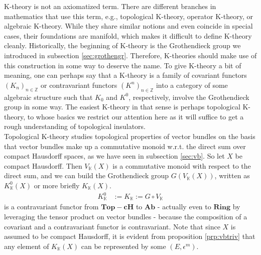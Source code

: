 \nocite{6342e665}
\nocite{8b5861fc}
\nocite{c7f15065}
K-theory is not an axiomatized term.
There are different branches in mathematics that use this term, e.g., topological K-theory, operator K-theory, or algebraic K-theory.
While they share similar notions and even coincide in special cases, their foundations are manifold, which makes it difficult to define K-theory cleanly.
Historically, the beginning of K-theory is the Grothendieck group we introduced in subsection \ref{sec:grothengr}.
Therefore, K-theories should make use of this construction in some way to deserve the name.
To give K-theory a bit of meaning, one can perhaps say that a K-theory is a family of covariant functors $(K_{n})_{n\in\mathbb{Z}}$ or contravariant functors $(K^{n})_{n\in\mathbb{Z}}$ into a category of some algebraic structure such that $K_{0}$ and $K^{0}$, respectively, involve the Grothendieck group in some way.
The easiest K-theory in that sense is perhaps topological K-theory, to whose basics we restrict our attention here as it will suffice to get a rough understanding of topological insulators.
\\
Topological K-theory studies topological properties of vector bundles on the basis that vector bundles make up a commutative monoid w.r.t. the direct sum over compact Hausdorff spaces, as we have seen in subsection \ref{sec:vb}.
So let $X$ be compact Hausdorff.
Then $V_{\mathbb{K}}(X)$ is a commutative monoid with respect to the direct sum, and we can build the Grothendieck group $G(V_{\mathbb{K}}(X))$, written as $K_{\mathbb{K}}^{0}(X)$ or more briefly $K_{\mathbb{K}}(X)$.
\begin{align*}
  K_{\mathbb{K}}^{0}
  &:=
  K_{\mathbb{K}}
  :=
  G
  \circ
  V_{\mathbb{K}}
\end{align*}
is a contravariant functor from $\mathbf{Top-cH}$ to $\mathbf{Ab}$ - actually even to $\mathbf{Ring}$ by leveraging the tensor product on vector bundles - because the composition of a covariant and a contravariant functor is contravariant.
Note that since $X$ is assumed to be compact Hausdorff, it is evident from proposition \ref{prp:vbtriv} that any element of $K_{\mathbb{K}}(X)$ can be represented by some $(E,\epsilon^{m})$.
\\
